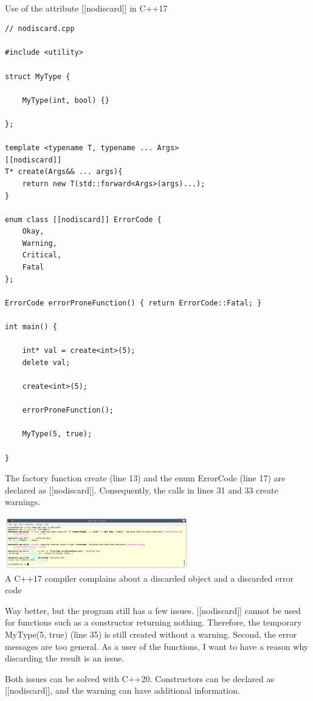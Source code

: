 \hspace*{\fill} \\ %
\noindent
Use of the attribute [[nodiscard]] in C++17
\begin{lstlisting}[style=styleCXX]
// nodiscard.cpp

#include <utility>

struct MyType {

	MyType(int, bool) {}

};

template <typename T, typename ... Args>
[[nodiscard]]
T* create(Args&& ... args){
	return new T(std::forward<Args>(args)...);
}

enum class [[nodiscard]] ErrorCode {
	Okay,
	Warning,
	Critical,
	Fatal
};

ErrorCode errorProneFunction() { return ErrorCode::Fatal; }

int main() {

	int* val = create<int>(5);
	delete val;
	
	create<int>(5);
	
	errorProneFunction();
	
	MyType(5, true);

}
\end{lstlisting}

The factory function create (line 13) and the enum ErrorCode (line 17) are declared as [[nodiscard]]. 
Consequently, the calls in lines 31 and 33 create warnings.

\begin{center}
\includegraphics[width=0.6\textwidth]{content/3/chapter4/images/45.png}\\
A C++17 compiler complains about a discarded object and a discarded error code
\end{center}

Way better, but the program still has a few issues. [[nodiscard]] cannot be used for functions such as a constructor returning nothing. Therefore, the temporary MyType(5, true) (line 35) is still created without a warning. Second, the error messages are too general. As a user of the functions, I want to have a reason why discarding the result is an issue.

Both issues can be solved with C++20. Constructors can be declared as [[nodiscard]], and the warning can have additional information.

